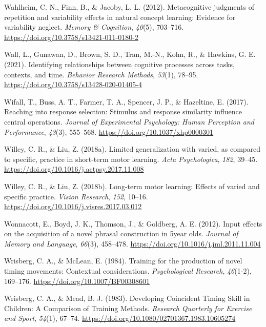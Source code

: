 \documentclass[
  11pt,
  letterpaper,
]{article}
\newlength{\cslhangindent}
\newenvironment{CSLReferences}[2] %
 {\begin{list}{}{%
  \setlength{\itemindent}{0pt}
  \setlength{\leftmargin}{0pt}
  \setlength{\parsep}{0pt}
  \ifodd #1
   \setlength{\leftmargin}{\cslhangindent}
   \setlength{\itemindent}{-1\cslhangindent}
  \fi
  \setlength{\itemsep}{#2\baselineskip}}}
 {\end{list}}
\begin{document}
\begin{CSLReferences}{1}{0}
Wahlheim, C. N., Finn, B., \& Jacoby, L. L. (2012). Metacognitive
judgments of repetition and variability effects in natural concept
learning: Evidence for variability neglect. \emph{Memory \& Cognition},
\emph{40}(5), 703--716. \url{https://doi.org/10.3758/s13421-011-0180-2}

Wall, L., Gunawan, D., Brown, S. D., Tran, M.-N., Kohn, R., \& Hawkins,
G. E. (2021). Identifying relationships between cognitive processes
across tasks, contexts, and time. \emph{Behavior Research Methods},
\emph{53}(1), 78--95. \url{https://doi.org/10.3758/s13428-020-01405-4}

Wifall, T., Buss, A. T., Farmer, T. A., Spencer, J. P., \& Hazeltine, E.
(2017). Reaching into response selection: {Stimulus} and response
similarity influence central operations. \emph{Journal of Experimental
Psychology: Human Perception and Performance}, \emph{43}(3), 555--568.
\url{https://doi.org/10.1037/xhp0000301}

Willey, C. R., \& Liu, Z. (2018a). Limited generalization with varied,
as compared to specific, practice in short-term motor learning.
\emph{Acta Psychologica}, \emph{182}, 39--45.
\url{https://doi.org/10.1016/j.actpsy.2017.11.008}

Willey, C. R., \& Liu, Z. (2018b). Long-term motor learning: {Effects}
of varied and specific practice. \emph{Vision Research}, \emph{152},
10--16. \url{https://doi.org/10.1016/j.visres.2017.03.012}

Wonnacott, E., Boyd, J. K., Thomson, J., \& Goldberg, A. E. (2012).
Input effects on the acquisition of a novel phrasal construction in
5year olds. \emph{Journal of Memory and Language}, \emph{66}(3),
458--478. \url{https://doi.org/10.1016/j.jml.2011.11.004}

Wrisberg, C. A., \& McLean, E. (1984). Training for the production of
novel timing movements: {Contextual} considerations. \emph{Psychological
Research}, \emph{46}(1-2), 169--176.
\url{https://doi.org/10.1007/BF00308601}

Wrisberg, C. A., \& Mead, B. J. (1983). Developing {Coincident Timing
Skill} in {Children}: {A Comparison} of {Training Methods}.
\emph{Research Quarterly for Exercise and Sport}, \emph{54}(1), 67--74.
\url{https://doi.org/10.1080/02701367.1983.10605274}


\end{CSLReferences}
\end{document}
